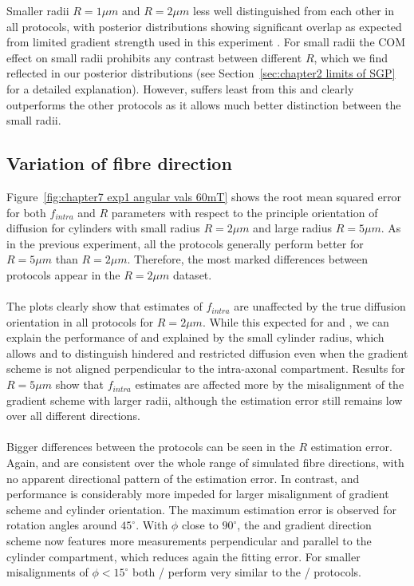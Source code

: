 Smaller radii $R=1\mu m$ and $R=2\mu m $ less well distinguished from each other in all protocols, with posterior distributions showing significant overlap as expected from limited gradient strength used in this experiment \citep{Alexander:2008,Alexander:2010,Siow:2012}. For small radii the \gls{COM} effect on small radii prohibits any contrast between different $R$, which we find reflected in our posterior distributions (see Section~\ref{sec:chapter2 limits of SGP} for a detailed explanation). However, {\FD} suffers least from this and clearly outperforms the other protocols as it allows much better distinction between the small radii.


\subsection{Variation of fibre direction}
Figure~\ref{fig:chapter7 exp1 angular vals 60mT} shows the root mean squared error for both $f_{intra}$ and $R$ parameters with respect to the principle orientation of diffusion for cylinders with small radius $R=2\mu m$ and large radius $R=5\mu m$. As in the previous experiment, all the protocols generally perform better for $R=5\mu m$ than $R=2\mu m$. Therefore, the most marked differences between protocols appear in the $R=2\mu m$ dataset.
\paragraph{}
The plots clearly show that estimates of $f_{intra}$ are unaffected by the true diffusion orientation in all protocols for $R=2\mu m$. While this expected for {\OI} and {\SD}, we can explain the performance of {\FD} and {\DO} explained by the small cylinder radius, which allows {\FD} and {\OI} to distinguish hindered and restricted diffusion even when the gradient scheme is not aligned perpendicular to the intra-axonal compartment. Results for $R=5\mu m$ show that $f_{intra}$ estimates are affected more by the misalignment of the gradient scheme with larger radii, although the estimation error still remains low over all different directions.

\paragraph{}
Bigger differences between the protocols can be seen in the $R$ estimation error. Again, {\OI} and {\SD} are consistent over the whole range of simulated fibre directions, with no apparent directional pattern of the estimation error. In contrast, {\FD} and {\DO} performance is considerably more impeded for larger misalignment of gradient scheme and cylinder orientation. The maximum estimation error is observed for rotation angles around $45^\circ$. With $\phi$ close to $90^\circ$, the {\SF} and {\DO} gradient direction scheme now features more measurements perpendicular and parallel to the cylinder compartment, which reduces again the fitting error. For smaller misalignments of $\phi<15^\circ$ both {\FD}/{\DO} perform very similar to the {\OI}/{\SD} protocols.

